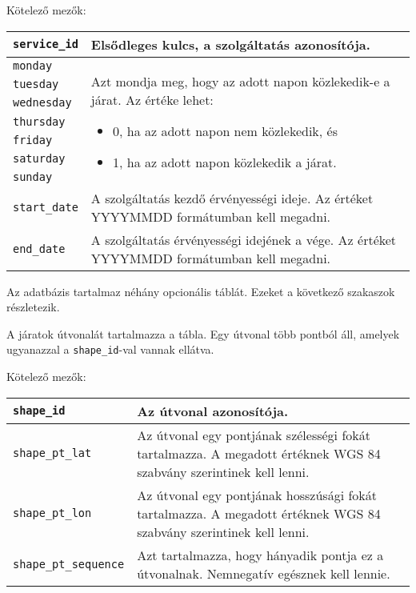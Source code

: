 \medskip

\noindent Kötelező mezők:

\bigskip

\begin{tabular}{|p{3.5cm}|p{10cm}|}
\hline
\texttt{service\_id} & Elsődleges kulcs, a szolgáltatás azonosítója. \\
\hline
\texttt{monday} & \multirow{7}{10cm}{Azt mondja meg, hogy az adott napon közlekedik-e a járat.
Az értéke lehet:
\begin{itemize}
\item 0, ha az adott napon nem közlekedik, és
\item 1, ha az adott napon közlekedik a járat.
\end{itemize}}
\\
\cline{1-1}
\texttt{tuesday} & \\
\cline{1-1}
\texttt{wednesday} & \\
\cline{1-1}
\texttt{thursday} & \\
\cline{1-1}
\texttt{friday} & \\
\cline{1-1}
\texttt{saturday} & \\
\cline{1-1}
\texttt{sunday} & \\
\hline
\texttt{start\_date} & A szolgáltatás kezdő érvényességi ideje. Az értéket YYYYMMDD formátumban kell megadni. \\
\hline
\texttt{end\_date} & A szolgáltatás érvényességi idejének a vége. Az értéket YYYYMMDD formátumban kell megadni. \\
\hline
\end{tabular}


Az adatbázis tartalmaz néhány opcionális táblát. Ezeket a következő szakaszok részletezik.


A járatok útvonalát tartalmazza a tábla. Egy útvonal több pontból áll, amelyek ugyanazzal a \texttt{shape\_id}-val vannak ellátva.

\newpage

\noindent Kötelező mezők:

\bigskip

\begin{tabular}{|p{3.7cm}|p{9.8cm}|}
\hline
\texttt{shape\_id} & Az útvonal azonosítója. \\
\hline
\texttt{shape\_pt\_lat} & Az útvonal egy pontjának szélességi fokát tartalmazza. A megadott értéknek WGS 84 szabvány szerintinek kell lenni. \\
\hline
\texttt{shape\_pt\_lon} & Az útvonal egy pontjának hosszúsági fokát tartalmazza. A megadott értéknek WGS 84 szabvány szerintinek kell lenni. \\
\hline
\texttt{shape\_pt\_sequence} & Azt tartalmazza, hogy hányadik pontja ez a útvonalnak. Nemnegatív egésznek kell lennie. \\
\hline
\end{tabular}

